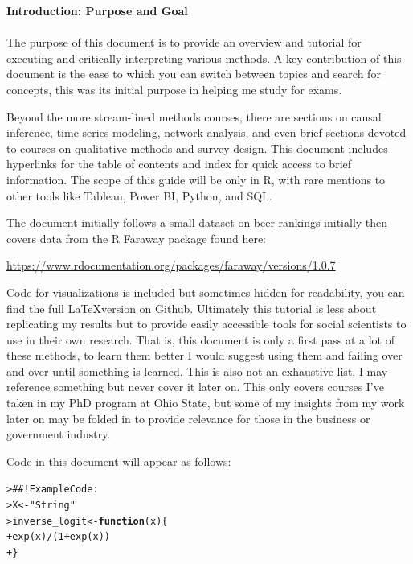 \documentclass[12pt]{article}\usepackage[]{graphicx}\usepackage[]{color}
\date{\today} %
\makeatletter
\newcommand{\hlnum}[1]{\textcolor[rgb]{0.82,0.78,0.62}{#1}}%
\newcommand{\hlstr}[1]{\textcolor[rgb]{0.82,0.78,0.62}{#1}}%
\newcommand{\hlcom}[1]{\textcolor[rgb]{0.404,0.408,0.42}{#1}}%
\newcommand{\hlopt}[1]{\textcolor[rgb]{0.882,0.878,0.898}{#1}}%
\newcommand{\hlstd}[1]{\textcolor[rgb]{0.882,0.878,0.898}{#1}}%
\newcommand{\hlkwa}[1]{\textcolor[rgb]{0.384,0.675,0.808}{\textbf{#1}}}%
\newcommand{\hlkwb}[1]{\textcolor[rgb]{0.902,0.675,0.196}{#1}}%
\newcommand{\hlkwc}[1]{\textcolor[rgb]{0.812,0.522,0.388}{#1}}%
\newcommand{\hlkwd}[1]{\textcolor[rgb]{0.733,0.388,0.812}{#1}}%
\newenvironment{kframe}{%
 \def\at@end@of@kframe{}%
 \ifinner\ifhmode%
  \def\at@end@of@kframe{\end{minipage}}%
  \begin{minipage}{\columnwidth}%
 \fi\fi%
 \def\FrameCommand##1{\hskip\@totalleftmargin \hskip-\fboxsep
 \colorbox{shadecolor}{##1}\hskip-\fboxsep
     \hskip-\linewidth \hskip-\@totalleftmargin \hskip\columnwidth}%
 \MakeFramed {\advance\hsize-\width
   \@totalleftmargin\z@ \linewidth\hsize
   \@setminipage}}%
 {\par\unskip\endMakeFramed%
 \at@end@of@kframe}
\newenvironment{knitrout}{}{} %
\makeatother
\begin{document}
\begin{flushleft}
\setlength{\parindent}{1cm} %



\thispagestyle{empty}
\noindent \textbf{Introduction: Purpose and Goal}\\
\hfill \\
The purpose of this document is to provide an overview and tutorial for executing and critically interpreting various methods. A key contribution of this document is the ease to which you can switch between topics and search for concepts, this was its initial purpose in helping me study for exams.

Beyond the more stream-lined methods courses, there are sections on causal inference, time series modeling, network analysis, and even brief sections devoted to courses on qualitative methods and survey design. This document includes hyperlinks for the table of contents and index for quick access to brief information. The scope of this guide will be only in R, with rare mentions to other tools like Tableau, Power BI, Python, and SQL.

The document initially follows a small dataset on beer rankings initially then covers data from the R Faraway package found here:

\begin{center}
\url{https://www.rdocumentation.org/packages/faraway/versions/1.0.7}
\end{center}

Code for visualizations is included but sometimes hidden for readability, you can find the full \LaTeX version on Github. Ultimately this tutorial is less about replicating my results but to provide easily accessible tools for social scientists to use in their own research. That is, this document is only a first pass at a lot of these methods, to learn them better I would suggest using them and failing over and over until something is learned. This is also not an exhaustive list, I may reference something but never cover it later on. This only covers courses I've taken in my PhD program at Ohio State, but some of my insights from my work later on may be folded in to provide relevance for those in the business or government industry.

Code in this document will appear as follows:




\begin{knitrout}
\color{fgcolor}\begin{kframe}
\begin{alltt}
\hlstd{> }\hlcom{##!  Example Code:}
\hlstd{> }\hlstd{X} \hlkwb{<-} \hlstr{"String"}
\hlstd{> }\hlstd{inverse_logit} \hlkwb{<-} \hlkwa{function}\hlstd{(}\hlkwc{x}\hlstd{)\{}
\hlstd{+ }     \hlkwd{exp}\hlstd{(x)}\hlopt{/}\hlstd{(}\hlnum{1}\hlopt{+}\hlkwd{exp}\hlstd{(x))}
\hlstd{+ }\hlstd{\}}
\end{alltt}
\end{kframe}
\end{knitrout}


\end{flushleft}
\end{document}
